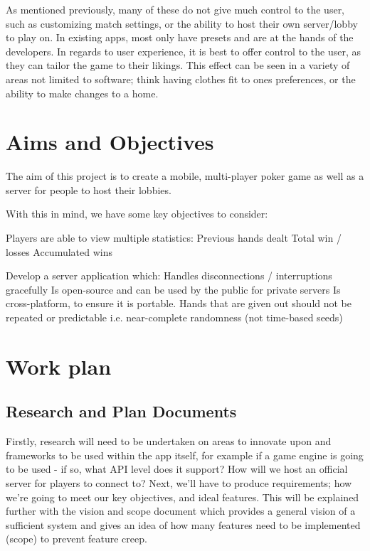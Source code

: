 \documentclass[11pt]{article}
\begin{document}
{\begin{center}
\end{center}

As mentioned previously, many of these do not give much control to the user, such as customizing match settings, or the ability to host their own server/lobby to play on. In existing apps, most only have presets and are at the hands of the developers. In regards to user experience, it is best to offer control to the user, as they can tailor the game to their likings. This effect can be seen in a variety of areas not limited to software; think having clothes fit to ones preferences, or the ability to make changes to a home. \cite{customize} %

\newpage
\section*{Aims and Objectives}

The aim of this project is to create a mobile, multi-player poker game as well as a server for people to host their lobbies. 

With this in mind, we have some key objectives to consider: 

\begin{outline}
	\1 Players are able to view multiple statistics:
		\2 Previous hands dealt
		\2 Total win / losses
		\2 Accumulated wins	
	
	\1 Develop a server application which: 
		\2 Handles disconnections / interruptions gracefully
		\2 Is open-source and can be used by the public for private servers
		\2 Is cross-platform, to ensure it is portable.
	\1 Hands that are given out should not be repeated or predictable i.e. near-complete randomness (not time-based seeds)
\end{outline}

\section*{Work plan}


\subsection*{Research and Plan Documents}

Firstly, research will need to be undertaken on areas to innovate upon and frameworks to be used within the app itself, for example if a game engine is going to be used - if so, what API level does it support? How will we host an official server for players to connect to? Next, we'll have to produce requirements; how we're going to meet our key objectives, and ideal features. This will be explained further with the vision and scope document which provides a general vision of a sufficient system and gives an idea of how many features need to be implemented (scope) to prevent feature creep.


}
\end{document}
